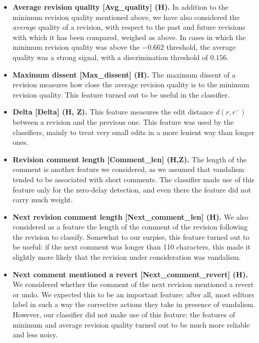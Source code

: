 \begin{itemize}
\item {\bf Average revision quality [Avg\_quality] (H).} In addition to the minimum revision quality mentioned above, we have also considered the {\em average\/} quality of a revision, with respect to the past and future revisions with which it has been compared, weighed as above. 
In cases in which the minimum revision quality was above the $-0.662$ threshold, the average quality was a strong signal, with a discrimination threshold of $0.156$. 

\item {\bf Maximum dissent [Max\_dissent] (H).}  The maximum dissent of a revision measures how close the average revision quality is to the minimum revision quality. 
This feature turned out to be useful in the classifier. 

\item{\bf Delta [Delta] (H, Z).}  This feature measures the edit distance $d(r, r^{-})$ between a revision and the previous one.  This feature was used by the classifiers, mainly to treat very small edits in a more lenient way than longer ones.

\item {\bf Revision comment length [Comment\_len] (H,Z).}  The length of the comment is another feature we considered, as we assumed that vandalism tended to be associated with short comments.  
The classifier made use of this feature only for the zero-delay detection, and even there the feature did not carry much weight. 

\item {\bf Next revision comment length [Next\_comment\_len] (H).}  We also considered as a feature the length of the comment of the revision following the revision to classify. 
Somewhat to our surpise, this feature turned out to be useful: if the next comment was longer than 110 characters, this made it slightly more likely that the revision under consideration was vandalism.

\item {\bf Next comment mentioned a revert [Next\_comment\_revert] (H).}  We considered whether the comment of the next revision mentioned a revert or undo.  We expected this to be an important feature: after all, most editors label in such a way the corrective actions they take in presence of vandalism.  However, our classifier did not make use of this feature: the features of minimum and average revision quality turned out to be much more reliable and less noisy.


\end{itemize}
